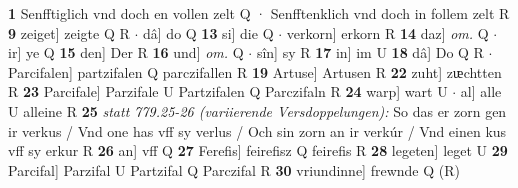 \documentclass[8pt,a4paper,notitlepage]{article}
\begin{document}
\begin{table}[ht]
\begin{minipage}[t]{0.5\linewidth}
\textbf{1} Senfftiglich vnd doch en vollen zelt Q · Senfftenklich vnd doch in follem zelt R \textbf{9} zeiget] zeigte Q R  $\cdot$ dâ] do Q \textbf{13} si] die Q  $\cdot$ verkorn] erkorn R \textbf{14} daz] \textit{om.} Q  $\cdot$ ir] ye Q \textbf{15} den] Der R \textbf{16} und] \textit{om.} Q  $\cdot$ sîn] sy R \textbf{17} in] im U \textbf{18} dâ] Do Q R  $\cdot$ Parcifalen] partzifalen Q parczifallen R \textbf{19} Artuse] Artusen R \textbf{22} zuht] zᵫchtten R \textbf{23} Parcifale] Parzifale U Partzifalen Q Parczifaln R \textbf{24} warp] wart U  $\cdot$ al] alle U alleine R \textbf{25} \textit{statt 779.25-26 (variierende Versdoppelungen):} So das er zorn gen ir verkus / Vnd one has vff sy verlus / Och sin zorn an ir verkúr / Vnd einen kus vff sy erkur R  \textbf{26} an] vff Q \textbf{27} Ferefis] feirefisz Q feirefis R \textbf{28} legeten] leget U \textbf{29} Parcifal] Parzifal U Partzifal Q Parczifal R \textbf{30} vriundinne] frewnde Q (R) \newline
\end{minipage}
\end{table}
\end{document}
